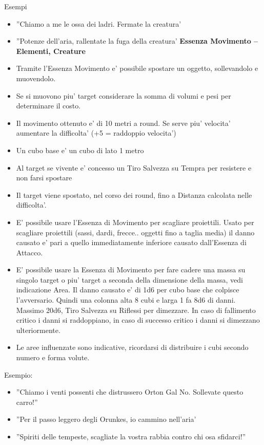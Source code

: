 \documentclass[a4paper,11pt,twoside,openany]{book}
\begin{document}
Esempi
\begin{itemize}
	\item 
	''Chiamo a me le ossa dei ladri. Fermate la creatura' 
	\item 
	''Potenze dell'aria, rallentate la fuga della creatura' 
	\textbf{Essenza Movimento -- Elementi, Creature}
	\item 
	Tramite l'Essenza Movimento e' possibile spostare un oggetto, sollevandolo e muovendolo. 
	\item 
	Se si muovono piu' target considerare la somma di volumi e pesi per determinare il costo. 
	\item 
	Il movimento ottenuto e' di 10 metri a round. Se serve piu' velocita' aumentare la difficolta' (+5 = raddoppio velocita') 
	\item 
	Un cubo base e' un cubo di lato 1 metro 
	\item 
	Al target se vivente e' concesso un Tiro Salvezza su Tempra per resistere e non farsi spostare 
	\item 
	Il target viene spostato, nel corso dei round, fino a Distanza calcolata nelle difficolta'. 
	\item 
	E' possibile usare l'Essenza di Movimento per scagliare proiettili. Usato per scagliare proiettili (sassi, dardi, frecce.. oggetti fino a taglia media) il danno causato e' pari a quello immediatamente inferiore causato dall'Essenza di Attacco. 
	\item 
	E' possibile usare la Essenza di Movimento per fare cadere una massa su singolo target o piu' target a seconda della dimensione della massa, vedi indicazione Area. Il danno causato e' di 1d6 per cubo base che colpisce l'avversario. Quindi una colonna alta 8 cubi e larga 1 fa 8d6 di danni. Massimo 20d6, Tiro Salvezza su Riflessi per dimezzare. In caso di fallimento critico i danni si raddoppiano, in caso di successo critico i danni si dimezzano ulteriormente. 
	\item 
	Le aree influenzate sono indicative, ricordarsi di distribuire i cubi secondo numero e forma volute. 
\end{itemize}
\bigskip


Esempio:
\begin{itemize}
\item 
''Chiamo i venti possenti che distrussero Orton Gal No. Sollevate questo carro!'' 
\item 
''Per il passo leggero degli Orunkes, io cammino nell'aria' 
\item 
''Spiriti delle tempeste, scagliate la vostra rabbia contro chi osa sfidarci!'' 
\end{itemize}
\end{document}
